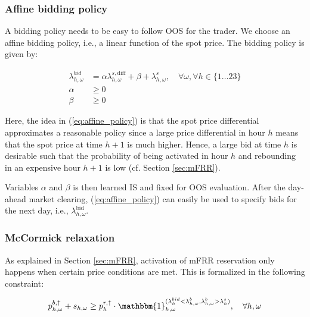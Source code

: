 \subsubsection{Affine bidding policy}

A bidding policy needs to be easy to follow OOS for the trader. We choose an affine bidding policy, i.e., a linear function of the spot price. The bidding policy is given by:

\begin{subequations}\label{eq:affine_policy}
    \begin{align}
        \lambda^{bid}_{h,\omega} & = \alpha \lambda_{h,\omega}^{s,\text{diff}} + \beta + \lambda_{h,\omega}^{s}, \quad \forall{\omega}, \forall{h} \in \{1\ldots23\}\label{affine_policy:1} \\
        \alpha                   & \geq 0\label{affine_policy:2}                                                                                                                            \\
        \beta                    & \geq 0\label{affine_policy:3}
    \end{align}
\end{subequations}

Here, the idea in (\ref{eq:affine_policy}) is that the spot price differential approximates a reasonable policy since a large price differential in hour $h$ means that the spot price at time $h+1$ is much higher. Hence, a large bid at time $h$ is desirable such that the probability of being activated in hour $h$ and rebounding in an expensive hour $h+1$ is low (cf. Section \ref{sec:mFRR}).

Variables $\alpha$ and $\beta$ is then learned IS and fixed for OOS evaluation. After the day-ahead market clearing, (\ref{eq:affine_policy}) can easily be used to specify bids for the next day, i.e., $\lambda_{h,\omega}^{\text{bid}}$.

\subsubsection{McCormick relaxation}\label{sec:mccormick}

As explained in Section \ref{sec:mFRR}, activation of mFRR reservation only happens when certain price conditions are met. This is formalized in the following constraint:

\begin{equation}\label{eq:bid_constraint}
    p^{b, \uparrow}_{h,\omega} + s_{h,\omega} \geq p^{r,\uparrow}_{h} \cdot \mathbbm{1}_{h,\omega}^{(\lambda^{bid}_{h} < \lambda^{b}_{h,\omega}, \lambda^{b}_{h,\omega} > \lambda^{s}_{h})}, \quad \forall{h,\omega}
\end{equation}

